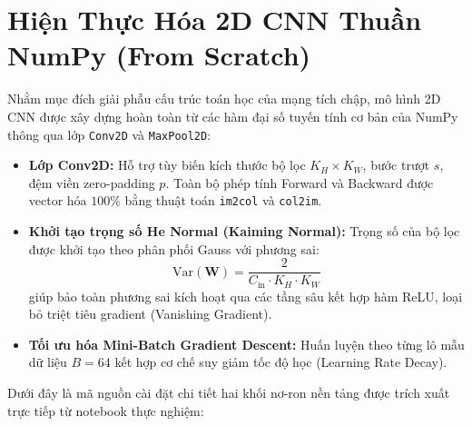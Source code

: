 \documentclass[12pt,a4paper]{report}
\begin{document}
\section{Hiện Thực Hóa 2D CNN Thuần NumPy (From Scratch)}
Nhằm mục đích giải phẫu cấu trúc toán học của mạng tích chập, mô hình 2D CNN được xây dựng hoàn toàn từ các hàm đại số tuyến tính cơ bản của NumPy thông qua lớp \texttt{Conv2D} và \texttt{MaxPool2D}:
\begin{itemize}
    \item \textbf{Lớp Conv2D:} Hỗ trợ tùy biến kích thước bộ lọc $K_H \times K_W$, bước trượt $s$, đệm viền zero-padding $p$. Toàn bộ phép tính Forward và Backward được vector hóa $100\%$ bằng thuật toán \texttt{im2col} và \texttt{col2im}.
    \item \textbf{Khởi tạo trọng số He Normal (Kaiming Normal):} Trọng số của bộ lọc được khởi tạo theo phân phối Gauss với phương sai:
    \begin{equation}
        \text{Var}(\mathbf{W}) = \frac{2}{C_{\text{in}} \cdot K_H \cdot K_W}
    \end{equation}
    giúp bảo toàn phương sai kích hoạt qua các tầng sâu kết hợp hàm ReLU, loại bỏ triệt tiêu gradient (Vanishing Gradient).
    \item \textbf{Tối ưu hóa Mini-Batch Gradient Descent:} Huấn luyện theo từng lô mẫu dữ liệu $B=64$ kết hợp cơ chế suy giảm tốc độ học (Learning Rate Decay).
\end{itemize}

Dưới đây là mã nguồn cài đặt chi tiết hai khối nơ-ron nền tảng được trích xuất trực tiếp từ notebook thực nghiệm:
\end{document}
